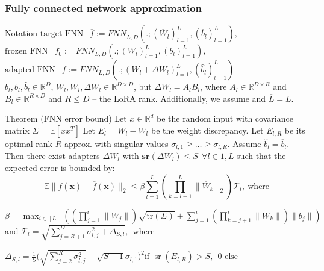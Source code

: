 \documentclass[10pt]{beamer}
\DeclareMathOperator{\sr}{sr}
\begin{document}
\begin{frame}
    \frametitle{Fully connected network approximation}
    \vspace{-0.3cm}
    \begin{block}{Notation}
        $\text{target FNN  }~~ \overline{f}:=FNN_{\overline{L},D}(.;(\overline{W}_l)_{l=1}^L, (\overline{b}_l)_{l=1}^L), $\\
        $\text{frozen FNN }~~ f_0:= FNN_{L,D}(.;(W_l)_{l=1}^L, (b_l)_{l=1}^L),$\\
        $\text{adapted FNN }~~ f:=FNN_{L,D}(.;(W_l + \Delta W_l)_{l=1}^L, (\hat{b}_l)_{l=1}^L)$\\
        $b_l, \overline{b}_l, \hat{b}_l \in \mathbb{R}^D$, $W_l, \overline{W}_l, \Delta W_l \in \mathbb{R}^{D\times D}$, but $\Delta W_l = A_l B_l$, where $A_l\in \mathbb{R}^{D\times R}$ and $B_l\in \mathbb{R}^{R\times D}$ and $R\leqslant D$ -- the LoRA rank. Additionally, we assume  and $\overline{L} = L$.
    \end{block}
    \begin{block}{Theorem (FNN error bound)}
        Let $x\in \mathbb{R}^d$ be the random input with covariance matrix $\Sigma = \mathbb{E}[xx^T]$
        Let $E_l = \overline{W}_l - W_l$ be the weight discrepancy. Let $E_{l,R}$ be its optimal rank-$R$ approx. with singular values $\sigma_{l,1} \geqslant \dots \geqslant \sigma_{l,R}$. Assume $\hat{b}_l = \overline{b}_l$. Then there exist adapters $\Delta W_l$ with $\mathbf{sr}(\Delta W_l) \leqslant S~~\forall l \in\overline{1, L}$ such that the expected error is bounded by:
        \vspace{-0.3cm}
        $$ \mathbb{E} \| f(\mathbf{x}) - \overline{f}(\mathbf{x}) \|_2 \leqslant \beta \sum_{l=1}^L \left( \prod_{k=l+1}^L \| \overline{W}_k \|_2 \right) \mathcal{T}_l, ~\text{where} $$
        \vspace{-0.3cm}

        $ \beta = \max_{i \in [L]} \left( \left( \prod_{j=1}^i \|\overline{W}_j\| \right) \sqrt{\text{tr}(\Sigma)} + \sum_{j=1}^i \left( \prod_{k=j+1}^i \|\overline{W}_k\| \right) \|\overline{b}_j\| \right) $\\
        and $ \mathcal{T}_l = \sqrt{ \sum_{j=R+1}^D \sigma_{l,j}^2 + \Delta_{S,l} }, ~~\text{where }$
        
        $\Delta_{S,l} = \frac{1}{S}\Big(\sqrt{\sum_{j=2}^R\sigma_{l,j}^2} - \sqrt{S-1}\sigma_{l,1}\Big)^2  \text{if } \sr(E_{l,R}) > S, ~~ 0 \text{ else} $
    \end{block}
\end{frame}
\end{document}

